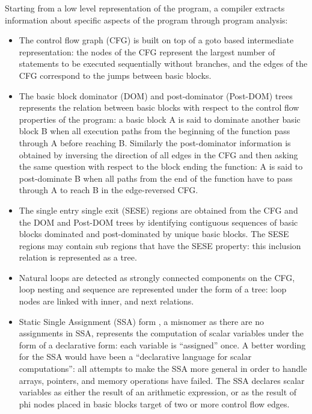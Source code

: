 \documentclass{sigplanconf}
\begin{document}
Starting from a low level representation of the program, a compiler extracts
information about specific aspects of the program through program analysis:

\begin{itemize}
\item The control flow graph (CFG) \cite{dragonbook} is built on top of a goto
  based intermediate representation: the nodes of the CFG represent the largest
  number of statements to be executed sequentially without branches, and the
  edges of the CFG correspond to the jumps between basic blocks.

\item The basic block dominator (DOM) and post-dominator (Post-DOM) trees
  \cite{dragonbook} represents the relation between basic blocks with respect to
  the control flow properties of the program: a basic block A is said to
  dominate another basic block B when all execution paths from the beginning of
  the function pass through A before reaching B.  Similarly the post-dominator
  information is obtained by inversing the direction of all edges in the CFG and
  then asking the same question with respect to the block ending the function: A
  is said to post-dominate B when all paths from the end of the function have to
  pass through A to reach B in the edge-reversed CFG.

\item The single entry single exit (SESE) regions \cite{keshav-pingali} are
  obtained from the CFG and the DOM and Post-DOM trees by identifying contiguous
  sequences of basic blocks dominated and post-dominated by unique basic blocks.
  The SESE regions may contain sub regions that have the SESE property: this
  inclusion relation is represented as a tree.

\item Natural loops \cite{dragonbook} are detected as strongly connected
  components \cite{tarjan} on the CFG, loop nesting and sequence are represented
  under the form of a tree: loop nodes are linked with inner, and next
  relations.

\item Static Single Assignment (SSA) form \cite{spop}, a misnomer as there are
  no assignments in SSA, represents the computation of scalar variables under
  the form of a declarative form: each variable is ``assigned'' once.  A better
  wording for the SSA would have been a ``declarative language for scalar
  computations'': all attempts to make the SSA more general in order to handle
  arrays, pointers, and memory operations have failed.  The SSA declares scalar
  variables as either the result of an arithmetic expression, or as the result
  of phi nodes placed in basic blocks target of two or more control flow edges.


\end{itemize}
\end{document}
